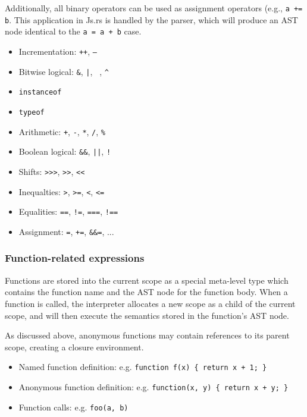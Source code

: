 \documentclass{article}
\begin{document}
\begin{multicols}{2}
Additionally, all binary operators can be used as assignment operators (e.g.,
\texttt{a += b}. This application in Js.rs is handled by the parser, which will
produce an AST node identical to the \texttt{a = a + b} case.

\begin{itemize}
  \item Incrementation: \texttt{++}, \texttt{--}
  \item Bitwise logical: \texttt{\&}, \texttt{|}, \texttt{~}, \texttt{\^}
  \item \texttt{instanceof}
  \item \texttt{typeof}
  \item Arithmetic: \texttt{+}, \texttt{-}, \texttt{*}, \texttt{/}, \texttt{\%}
  \item Boolean logical: \texttt{\&\&}, \texttt{||}, \texttt{!}
  \item Shifts: \texttt{>>>}, \texttt{>>}, \texttt{<<}
  \item Inequalties: \texttt{>}, \texttt{>=}, \texttt{<}, \texttt{<=}
  \item Equalities: \texttt{==}, \texttt{!=}, \texttt{===}, \texttt{!==}
  \item Assignment: \texttt{=}, \texttt{+=}, \texttt{\&\&=}, ...
\end{itemize}

\subsubsection*{Function-related expressions}

Functions are stored into the current scope as a special meta-level type which
contains the function name and the AST node for the function body. When a
function is called, the interpreter allocates a new scope as a child of the
current scope, and will then execute the semantics stored in the function's
AST node. \newline

As discussed above, anonymous functions may contain references to its parent
scope, creating a closure environment.

\begin{itemize}
  \item Named function definition: e.g. \texttt{function f(x) \{ return x + 1; \} }
  \item Anonymous function definition: e.g. \texttt{function(x, y) \{ return x + y; \} }
  \item Function calls: e.g. \texttt{foo(a, b)}
\end{itemize}


\end{multicols}
\end{document}
